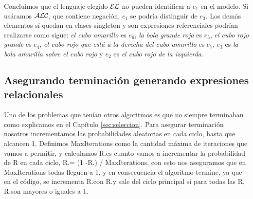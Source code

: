 Concluimos que el lenguaje elegido $\mathcal{EL}$ no pueden identificar a $e_1$ en el modelo. Si us\'aramos $\mathcal{ALC}$, que contiene negaci\'on, $e_1$ se podr\'ia distinguir de $e_3$. Los dem\'as elementos s\'i quedan en clases singleton y son expresiones referenciales podr\'ian realizarse como sigue:
{\it el cubo amarillo} es $e_6$, {\it la bola grande roja} es $e_5$, {\it el cubo rojo grande} es $e_4$, {\it el cubo rojo que est\'a a la derecha del cubo amarillo} es $e_7$, $e_3$ es {\it la bola amarilla sobre el cubo rojo} y $e_2$ es {\it el cubo rojo de la izquierda}.
 






\subsection{Asegurando terminaci\'on generando expresiones relacionales}

Uno de los problemas que ten\'ian otros algoritmos es que no siempre terminaban como explicamos en el Cap\'itulo \ref{sec:seleccion}. Para asegurar terminaci\'on nosotros incrementamos las probabilidades aleatorias en cada ciclo, hasta que alcancen 1. Definimos MaxIterations como la cantidad m\'axima de iteraciones que vamos a permitir, y calculamos R.\incuse es cuanto vamos a incrementar la probabilidad de R en cada ciclo, R.\incuse = (1 -R.\puse) / MaxIterations, con esto nos aseguramos que en MaxIterations todas lleguen a 1, y en consecuencia el algoritmo termine, ya que en el c\'odigo, se incrementa R.\puse con R.\incuse y sale del ciclo principal si para todas las R, R.\puse son mayores o iguales a 1.

